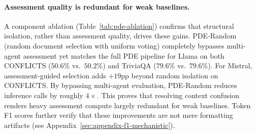 \documentclass[11pt]{article}
\theoremstyle{definition}
\begin{document}
\paragraph{Assessment quality is redundant for weak baselines.}
A component ablation (Table~\ref{tab:pde-ablation}) confirms that structural isolation, rather than assessment quality, drives these gains. PDE-Random (random document selection with uniform voting) completely bypasses multi-agent assessment yet matches the full PDE pipeline for Llama on both CONFLICTS (\(50.6\%\) vs.\ \(50.2\%\)) and TriviaQA (\(79.6\%\) vs.\ \(79.6\%\)). For Mistral, assessment-guided selection adds \(+19\)pp beyond random isolation on CONFLICTS. By bypassing multi-agent evaluation, PDE-Random reduces inference calls by roughly \(4\times\). This proves that resolving context confusion renders heavy assessment compute largely redundant for weak baselines. Token F1 scores further verify that these improvements are not mere formatting artifacts (see Appendix~\ref{sec:appendix-f1-mechanistic}).

\begin{table}[t]
\centering
{}
\caption{\textbf{PDE component ablation (EM\%) reveals that multi-agent assessment is redundant for weak baselines.} For Llama, completely assessment-free isolation (\textit{Rand.}) yields identical outsized gains as the computationally heavy \textit{Full} pipeline, proving that resolving context confusion drives the improvement. (\textit{Cost multipliers} indicate relative inference calls vs.\ standard RAG. CFL=Conflicts, TQA=TriviaQA; NF=No Filter; Unif.=assessment-guided + uniform vote; Full=score-weighted vote.)}
\label{tab:pde-ablation}
\end{table}
\end{document}

